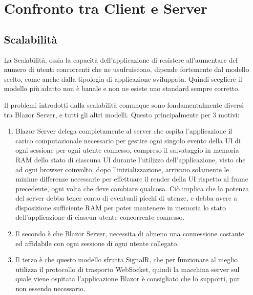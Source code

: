 \chapter{Confronto tra Client e Server}\label{cap:scalprocont}
\section{Scalabilit\`a}\label{sez:scalabilita}
La Scalabilit\`a, ossia la capacit\`a dell'applicazione di resistere all'aumentare del numero di utenti concorrenti che ne usufruiscono, dipende fortemente dal modello scelto, come anche dalla tipologia di applicazione sviluppata.
Quindi scegliere il modello pi\`u adatto non \`e banale e non ne esiste uno standard sempre corretto.

Il problemi introdotti dalla scalabilit\`a comunque sono fondamentalmente diversi tra Blazor Server, e tutti gli altri modelli.
Questo principalmente per 3 motivi:
\begin{enumerate}
	\item Blazor Server delega completamente al server che ospita l'applicazione il carico computazionale necessario per gestire ogni singolo evento della UI di ogni sessione per ogni utente connesso, compreso il salvataggio in memoria RAM dello stato di ciascuna UI durante l'utilizzo dell'applicazione, visto che ad ogni browser coinvolto, dopo l'inizializzazione, arrivano solamente le minime differenze necessarie per effettuare il render della UI rispetto al frame precedente, ogni volta che deve cambiare qualcosa.
	Ci\`o implica che la potenza del server debba tener conto di eventuali picchi di utenze, e debba avere a disposizione sufficiente RAM per poter mantenere in memoria lo stato dell'applicazione di ciascun utente concorrente connesso.
	
	\item Il secondo \`e che Blazor Server, necessita di almeno una connessione costante ed affidabile con ogni sessione di ogni utente collegato.
	
	\item Il terzo \`e che questo modello sfrutta SignalR, che per funzionare al meglio utilizza il protocollo di trasporto WebSocket, quindi la macchina server sul quale viene ospitata l'applicazione Blazor \`e consigliato che lo supporti, pur non essendo necessario.
\end{enumerate}


